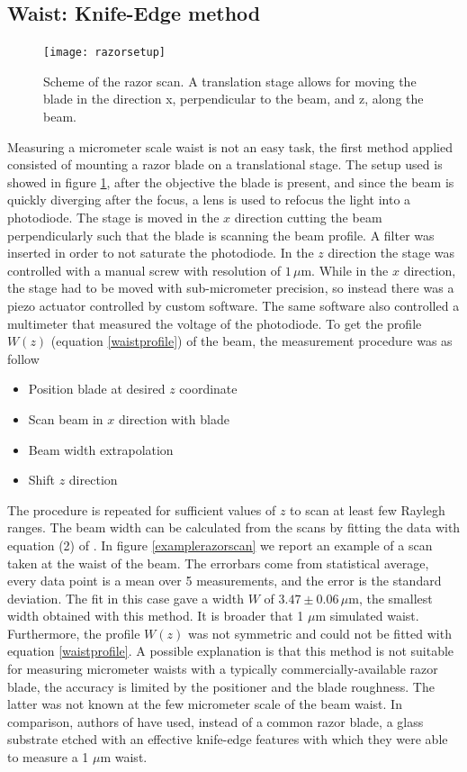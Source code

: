 \subsection{Waist: Knife-Edge method}
\label{sec:knifeedge}
\begin{figure}[H]
\centering
\texttt{[image: razorsetup]}
\caption{Scheme of the razor scan. A translation stage allows for moving the blade in the direction x, perpendicular to the beam, and z, along the beam.}
\label{razorscan}
\end{figure}
Measuring a micrometer scale waist is not an easy task, the first method applied consisted of mounting a razor blade on a translational stage. The setup used is showed in figure \ref{razorscan}, after the objective the blade is present, and since the beam is quickly diverging after the focus, a lens is used to refocus the light into a photodiode. The stage is moved in the $x$ direction cutting the beam perpendicularly such that the blade is scanning the beam profile. A filter was inserted in order to not saturate the photodiode.
In the $z$ direction the stage was controlled with a manual screw with resolution of $1\,\mu$m. While in the $x$ direction, the stage had to be moved with sub-micrometer precision, so instead there was a piezo actuator controlled by custom software. The same software also controlled a multimeter that measured the voltage of the photodiode. To get the profile $W(z)$ (equation \eqref{waistprofile}) of the beam, the measurement procedure was as follow
\begin{itemize}
\item Position blade at desired $z$ coordinate
\item Scan beam in $x$ direction with blade
\item Beam width extrapolation
\item Shift $z$ direction
\end{itemize}
The procedure is repeated for sufficient values of $z$ to scan at least few Raylegh ranges. The beam width can be calculated from the scans by fitting the data with equation (2) of \cite{knifeedge}. In figure \ref{examplerazorscan} we report an example of a scan taken at the waist of the beam. The errorbars come from statistical average, every data point is a mean over 5 measurements, and the error is the standard deviation. The fit in this case gave a width $W$ of $3.47\pm 0.06\,\mu$m, the smallest width obtained with this method. It is broader that 1 $\mu$m simulated waist. Furthermore, the profile $W(z)$ was not symmetric and could not be fitted with equation \eqref{waistprofile}. A possible explanation is that this method is not suitable for measuring micrometer waists with a typically commercially-available razor blade, the accuracy is limited by the positioner and the blade roughness. The latter was not known at the few micrometer scale of the beam waist. In comparison, authors of \cite{Cannon:86} have used, instead of a common razor blade, a glass substrate etched with an effective knife-edge features with which they were able to measure a 1 $\mu$m waist.
